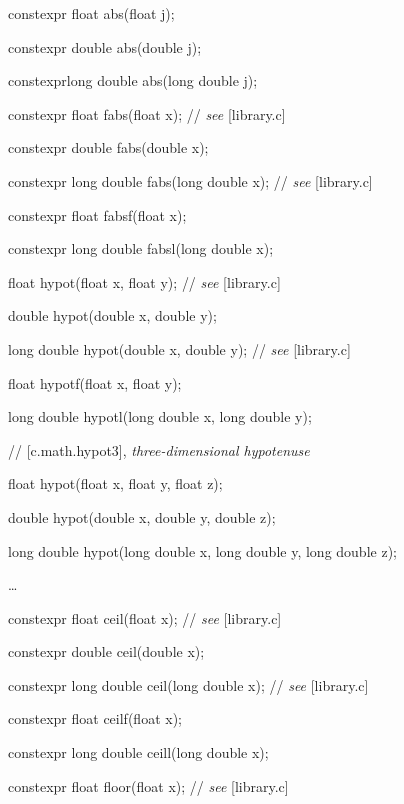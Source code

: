 \documentclass[prd,twocolumn,amsmath,amssymb,nofootinbib,eqsecnum]{revtex4-1}
\newcommand{\highlight}[1]{{\color{red} #1}}
\newcommand{\stdcomment}[1]{{// {\it see} [#1]}}
\begin{document}
{\highlight{constexpr} float abs(float j);

\highlight{constexpr} double abs(double j);

\highlight{constexpr}long double abs(long double j);

\vspace{2ex}

\highlight{constexpr} float fabs(float x); \stdcomment{library.c}

\highlight{constexpr} double fabs(double x);

\highlight{constexpr} long double fabs(long double x); \stdcomment{library.c}

\highlight{constexpr} float fabsf(float x);

\highlight{constexpr} long double fabsl(long double x);

\vspace{2ex}

float hypot(float x, float y); \stdcomment{library.c}

double hypot(double x, double y);

long double hypot(double x, double y); \stdcomment{library.c}

float hypotf(float x, float y);

long double hypotl(long double x, long double y);

\vspace{2ex}

// [c.math.hypot3], {\it three-dimensional hypotenuse}

float hypot(float x, float y, float z);

double hypot(double x, double y, double z);

long double hypot(long double x, long double y, long double z);

\vspace{2ex}
\ldots
\vspace{2ex}

\highlight{constexpr} float ceil(float x); \stdcomment{library.c}

\highlight{constexpr} double ceil(double x);

\highlight{constexpr} long double ceil(long double x); \stdcomment{library.c}

\highlight{constexpr} float ceilf(float x);

\highlight{constexpr} long double ceill(long double x);

\vspace{2ex}

\highlight{constexpr} float floor(float x); \stdcomment{library.c}

}
\end{document}
